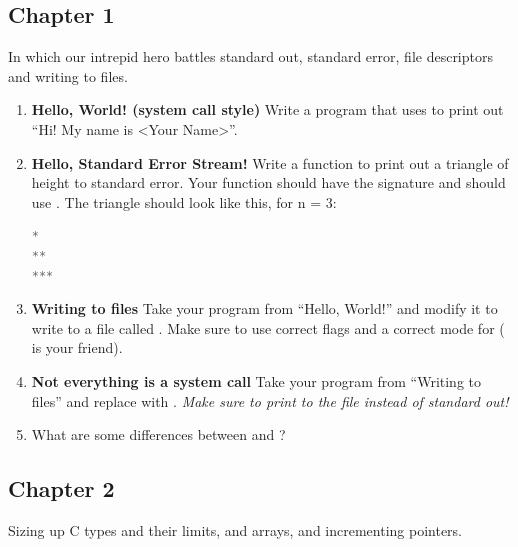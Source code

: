 \subsection{Chapter 1}

In which our intrepid hero battles standard out, standard error, file descriptors and writing to files.

\begin{enumerate}
\item \textbf{Hello, World! (system call style)} Write a program that uses  to print out ``Hi! My name is <Your Name>''.
\item \textbf{Hello, Standard Error Stream!} Write a function to print out a triangle of height  to standard error.
Your function should have the signature  and should use .
The triangle should look like this, for n = 3:
\begin{lstlisting}[language=C]
*
**
***
\end{lstlisting}
\item \textbf{Writing to files} Take your program from ``Hello, World!'' and modify it to write to a file called . Make sure to use correct flags and a correct mode for  ( is your friend).
\item \textbf{Not everything is a system call} Take your program from ``Writing to files'' and replace  with . \textit{Make sure to print to the file instead of standard out!}
\item What are some differences between  and ?
\end{enumerate}

\subsection{Chapter 2}

Sizing up C types and their limits,  and  arrays, and incrementing pointers.


